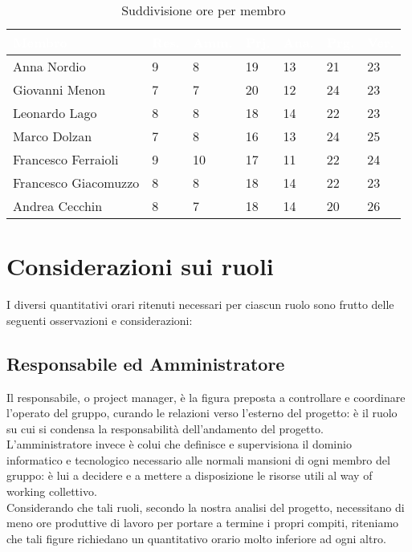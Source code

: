 \documentclass[12pt]{article}
\begin{document}
\begin{table}[h!]
    \centering
    \begin{tabularx}{\textwidth}{| l | X | X | X | X | X | X |}
        \hline
        \rowcolor{headerrow} \textbf{\textcolor{white}{Membro}} & \textbf{\textcolor{white}{Res.}} & \textbf{\textcolor{white}{Amm.}} & \textbf{\textcolor{white}{Prj.}} & \textbf{\textcolor{white}{Ana.}} & \textbf{\textcolor{white}{Prg.}} & \textbf{\textcolor{white}{Ver.}} \\
        \hline
        Anna Nordio & 9 & 8  & 19 & 13 & 21 & 23 \\
        \hline
        Giovanni Menon & 7 & 7  & 20 & 12 & 24 &  23\\
        \hline
        Leonardo Lago & 8 & 8  & 18 & 14 & 22 &  23\\
        \hline
        Marco Dolzan & 7 & 8  & 16 & 13 & 24 & 25 \\
        \hline
        Francesco Ferraioli & 9 & 10  & 17 & 11 & 22 & 24\\
        \hline
        Francesco Giacomuzzo & 8 & 8  & 18 & 14 & 22 & 23\\
        \hline
        Andrea Cecchin & 8 & 7  & 18 & 14 & 20 & 26\\
        \hline
    \end{tabularx}
    \caption{Suddivisione ore per membro}
    \label{tab:ore}
\end{table}
\endgroup

\section{Considerazioni sui ruoli} \label{sec:considerazioniSR}
I diversi quantitativi orari ritenuti necessari per ciascun ruolo sono frutto delle seguenti osservazioni e considerazioni:
    \subsection{Responsabile ed Amministratore} \label{subsec:Resp&Amm}
Il responsabile, o project manager, è la figura preposta a controllare e coordinare l'operato del gruppo, curando le relazioni verso l'esterno del progetto: è il ruolo su cui si condensa la responsabilità dell'andamento del progetto. L'amministratore invece è colui che definisce e supervisiona il dominio informatico e tecnologico necessario alle normali mansioni di ogni membro del gruppo: è lui a decidere e a mettere a disposizione le risorse utili al way of working collettivo.\\
Considerando che tali ruoli, secondo la nostra analisi del progetto, necessitano di meno ore produttive di lavoro per portare a termine i propri compiti, riteniamo che tali figure richiedano un quantitativo orario molto inferiore ad ogni altro.
\end{document}
